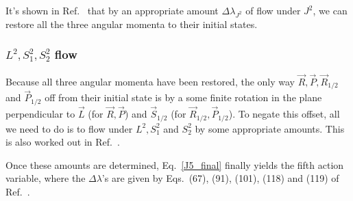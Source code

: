 It's shown in Ref.~\cite{tanay2021action} that by an appropriate amount
$\Delta \lambda_{J^2}$ of flow under $J^2$, we can restore all the three angular momenta to their initial states.


\subsubsection{$L^2, S_1^2, S_2^2$ flow}

Because all three angular momenta have been restored, the only
way $\vec{R}, \vec{P}, \vec{R}_{1/2}$ and $\vec{P}_{1/2}$ off from their 
initial state is by a some finite rotation in the plane perpendicular
to $\vec{L}$ (for $\vec{R}, \vec{P}$) 
and $\vec{S}_{1/2}$ (for $\vec{R}_{1/2}, \vec{P}_{1/2}$). To negate this offset,
all we need to do is to flow under $L^2, S_1^2$ and $S_2^2$ by some
appropriate amounts. This is also worked out in Ref.~\cite{tanay2021action}.






Once these amounts are determined, Eq.~\ref{J5_final}
finally yields the fifth action variable, where the $\Delta \lambda$'s are 
given by Eqs.~(67), (91), (101), (118) and (119) of Ref.~\cite{tanay2021action}.





















